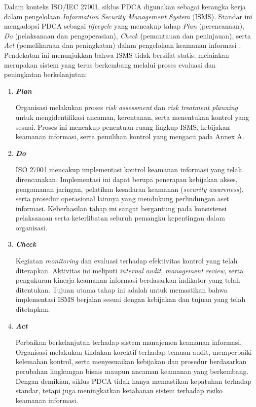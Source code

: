 Dalam konteks ISO/IEC 27001, siklus PDCA digunakan sebagai kerangka kerja dalam pengelolaan \textit{Information Security Management System} (ISMS). Standar ini mengadopsi PDCA sebagai \textit{lifecycle} yang mencakup tahap \textit{Plan} (perencanaan), \textit{Do} (pelaksanaan dan pengoperasian), \textit{Check} (pemantauan dan peninjauan), serta \textit{Act} (pemeliharaan dan peningkatan) dalam pengelolaan keamanan informasi \cite{gantz2014itaudit}. Pendekatan ini menunjukkan bahwa ISMS tidak bersifat statis, melainkan merupakan sistem yang terus berkembang melalui proses evaluasi dan peningkatan berkelanjutan:

\begin{enumerate}
	\item \textbf{\textit{Plan}}

	Organisasi melakukan proses \textit{risk assessment} dan \textit{risk treatment planning} untuk mengidentifikasi ancaman, kerentanan, serta menentukan kontrol yang sesuai. Proses ini mencakup penentuan ruang lingkup ISMS, kebijakan keamanan informasi, serta pemilihan kontrol yang mengacu pada Annex A.

	\item \textbf{\textit{Do}}

	ISO 27001 mencakup implementasi kontrol keamanan informasi yang telah direncanakan. Implementasi ini dapat berupa penerapan kebijakan akses, pengamanan jaringan, pelatihan kesadaran keamanan (\textit{security awareness}), serta prosedur operasional lainnya yang mendukung perlindungan aset informasi. Keberhasilan tahap ini sangat bergantung pada konsistensi pelaksanaan serta keterlibatan seluruh pemangku kepentingan dalam organisasi.

	\item \textbf{\textit{Check}}

	Kegiatan \textit{monitoring} dan evaluasi terhadap efektivitas kontrol yang telah diterapkan. Aktivitas ini meliputi \textit{internal audit}, \textit{management review}, serta pengukuran kinerja keamanan informasi berdasarkan indikator yang telah ditentukan. Tujuan utama tahap ini adalah untuk memastikan bahwa implementasi ISMS berjalan sesuai dengan kebijakan dan tujuan yang telah ditetapkan.

	\item \textbf{\textit{Act}}

	Perbaikan berkelanjutan terhadap sistem manajemen keamanan informasi. Organisasi melakukan tindakan korektif terhadap temuan audit, memperbaiki kelemahan kontrol, serta menyesuaikan kebijakan dan prosedur berdasarkan perubahan lingkungan bisnis maupun ancaman keamanan yang berkembang. Dengan demikian, siklus PDCA tidak hanya memastikan kepatuhan terhadap standar, tetapi juga meningkatkan ketahanan sistem terhadap risiko keamanan informasi.
\end{enumerate}

